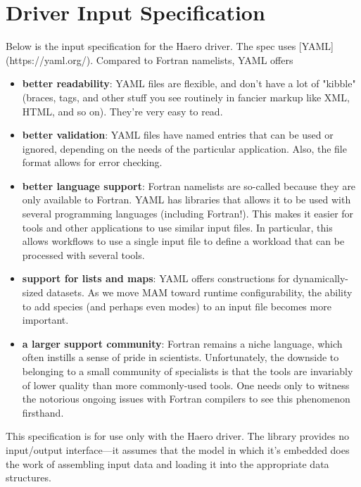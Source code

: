 \section{Driver Input Specification}

Below is the input specification for the Haero driver. The spec uses
[YAML](https://yaml.org/). Compared to Fortran namelists, YAML offers

\begin{itemize}
  \item {\bf better readability}: YAML files are flexible, and don't have a lot
    of "kibble" (braces, tags, and other stuff you see routinely in fancier
    markup like XML, HTML, and so on). They're very easy to read.
  \item {\bf better validation}: YAML files have named entries that can be
    used or ignored, depending on the needs of the particular application.
    Also, the file format allows for error checking.
  \item {\bf better language support}: Fortran namelists are so-called because
    they are only available to Fortran. YAML has libraries that allows it to
    be used with several programming languages (including Fortran!). This makes
    it easier for tools and other applications to use similar input files. In
    particular, this allows workflows to use a single input file to define a
    workload that can be processed with several tools.
  \item {\bf support for lists and maps}: YAML offers constructions for
    dynamically-sized datasets. As we move MAM toward runtime configurability,
    the ability to add species (and perhaps even modes) to an input file
    becomes more important.
  \item {\bf a larger support community}: Fortran remains a niche language,
    which often instills a sense of pride in scientists. Unfortunately, the
    downside to belonging to a small community of specialists is that the tools
    are invariably of lower quality than more commonly-used tools. One needs
    only to witness the notorious ongoing issues with Fortran compilers to see
    this phenomenon firsthand.
\end{itemize}

This specification is for use only with the Haero driver. The library provides
no input/output interface---it assumes that the model in which it's embedded
does the work of assembling input data and loading it into the appropriate
data structures.

